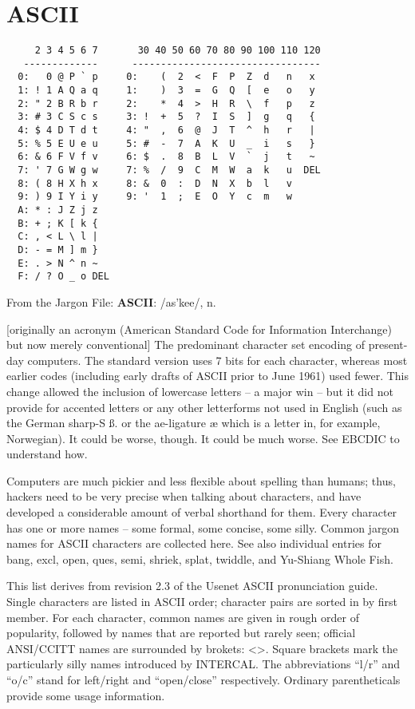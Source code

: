 \documentclass[10pt,twoside,openright]{memoir}
\begin{document}
\chapter{ASCII}

{\footnotesize
\begin{verbatim}
     2 3 4 5 6 7       30 40 50 60 70 80 90 100 110 120
   -------------      ---------------------------------
  0:   0 @ P ` p     0:    (  2  <  F  P  Z  d   n   x
  1: ! 1 A Q a q     1:    )  3  =  G  Q  [  e   o   y
  2: " 2 B R b r     2:    *  4  >  H  R  \  f   p   z
  3: # 3 C S c s     3: !  +  5  ?  I  S  ]  g   q   {
  4: $ 4 D T d t     4: "  ,  6  @  J  T  ^  h   r   |
  5: % 5 E U e u     5: #  -  7  A  K  U  _  i   s   }
  6: & 6 F V f v     6: $  .  8  B  L  V  `  j   t   ~
  7: ' 7 G W g w     7: %  /  9  C  M  W  a  k   u  DEL
  8: ( 8 H X h x     8: &  0  :  D  N  X  b  l   v
  9: ) 9 I Y i y     9: '  1  ;  E  O  Y  c  m   w
  A: * : J Z j z
  B: + ; K [ k {
  C: , < L \ l |
  D: - = M ] m }
  E: . > N ^ n ~
  F: / ? O _ o DEL  
\end{verbatim}
}

\noindent From the Jargon File: \textbf{ASCII}: /as'kee/, n.

[originally an acronym (American Standard Code for Information Interchange) but now merely conventional] The predominant character set encoding of present-day computers. The standard version uses 7 bits for each character, whereas most earlier codes (including early drafts of ASCII prior to June 1961) used fewer. This change allowed the inclusion of lowercase letters -- a major win -- but it did not provide for accented letters or any other letterforms not used in English (such as the German sharp-S {\ss}. or the ae-ligature {\ae} which is a letter in, for example, Norwegian). It could be worse, though. It could be much worse. See EBCDIC to understand how.

Computers are much pickier and less flexible about spelling than humans; thus, hackers need to be very precise when talking about characters, and have developed a considerable amount of verbal shorthand for them. Every character has one or more names -- some formal, some concise, some silly. Common jargon names for ASCII characters are collected here. See also individual entries for bang, excl, open, ques, semi, shriek, splat, twiddle, and Yu-Shiang Whole Fish.

This list derives from revision 2.3 of the Usenet ASCII pronunciation guide. Single characters are listed in ASCII order; character pairs are sorted in by first member. For each character, common names are given in rough order of popularity, followed by names that are reported but rarely seen; official ANSI/CCITT names are surrounded by brokets: <>. Square brackets mark the particularly silly names introduced by INTERCAL. The abbreviations ``l/r'' and ``o/c'' stand for left/right and ``open/close'' respectively. Ordinary parentheticals provide some usage information.
\end{document}
